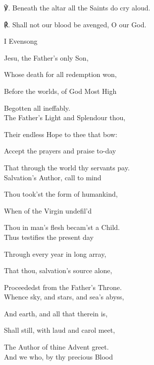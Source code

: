 ℣. Beneath the altar all the Saints do cry aloud.

℟. Shall not our blood be avenged, O our God.




\begin{paracol}{2}[]
\sloppy
\begin{inhead}
	I Evensong
\end{inhead}
\begin{hangparas}{1.25em}{1}

Jesu, the Father's only Son,

Whose death for all redemption won,

Before the worlds, of God Most High

Begotten all ineffably.\\

The Father's Light and Splendour thou,

Their endless Hope to thee that bow:

Accept the prayers and praise to-day

That through the world thy servants pay.\\

Salvation's Author, call to mind

Thou took'st the form of humankind,

When of the Virgin undefil'd

Thou in man's flesh becam'st a Child.\\

Thus testifies the present day

Through every year in long array,

That thou, salvation's source alone,

Proceededst from the Father's Throne.\\

Whence sky, and stars, and sea's abyss,

And earth, and all that therein is,

Shall still, with laud and carol meet,

The Author of thine Advent greet.\\

And we who, by thy precious Blood


\end{hangparas}
\end{paracol}
